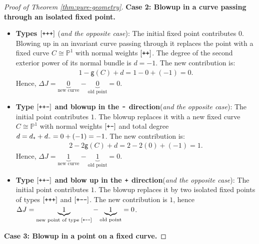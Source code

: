 \documentclass[12pt,a4paper]{amsart}
\theoremstyle{definition}
\theoremstyle{remark}
\newcommand{\lp}{\textup{\texttt{+}}}
\newcommand{\lm}{\textup{\texttt{-}}}
\begin{document}
\begin{proof}[Proof of Theorem \ref{thm:pure-geometry}]
\noindent \textbf{Case 2: Blowup in a curve passing through an isolated fixed point.}

\begin{itemize}
    \item \textbf{Types $[\lp\lp\lp]$} (\textit{and the opposite case}):  The initial fixed point contributes $0$. Blowing up in an invariant curve passing through it replaces the point with a fixed curve $C \cong \mathbb{P}^1$ with normal weights $[\lp\lp]$. The degree of the second exterior power of its normal bundle is $d=-1$. The new contribution is:
    \begin{align}
        1 - \mathsf{g}(C) + d = 1 - 0 + (-1) = 0.
    \end{align}
    Hence, $\Delta J = \underbrace{0}_{\text{new curve}} - \underbrace{0}_{\text{old point}} = 0$.

    \item \textbf{Type $[\lp\lp\lm]$ and blowup in the $\lm$ direction}(\textit{and the opposite case}): The initial point contributes $1$. The blowup replaces it with a new fixed curve $C \cong \mathbb{P}^1$ with normal weights $[\lp\lm]$ and total degree $d=d_\lp+d_\lm = 0+(-1)=-1$. The new contribution is:
    \begin{align}
        2 - 2\mathsf{g}(C) + d = 2 - 2(0) + (-1) = 1.
    \end{align}
    Hence, $\Delta J =\underbrace{1} _{\text{new curve}} - \underbrace{1}_{\text{old point}} = 0$.

    \item \textbf{Type $[\lp\lp\lm]$ and blow up in the $\lp$ direction}(\textit{and the opposite case}):
     The initial point contributes $1$. The blowup replaces it by two isolated fixed points of types $[\lp\lp\lp]$ and $[\lp\lm\lm]$. The new contribution is $1$, hence $\Delta J=\underbrace{1}_{\text{new point of type }[\lp\lm\lm]}-\underbrace{1}_{\text{old point}}=0$.
\end{itemize}

\noindent \textbf{Case 3: Blowup in a point on a fixed curve.}


\end{proof}
\end{document}
